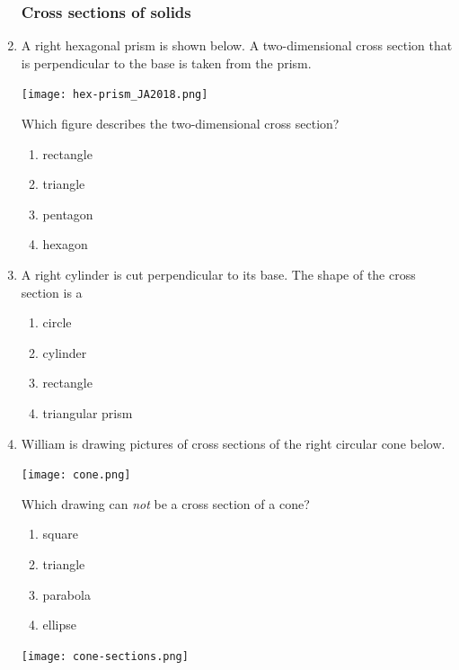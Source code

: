\documentclass[12pt, twoside]{article}
\begin{document}
\begin{enumerate}
  \newpage	
  \subsubsection*{Cross sections of solids} %
    
  \item %
  A right hexagonal prism is shown below. A two-dimensional cross section that is perpendicular to the base is taken from the prism.
    \begin{center}
    \texttt{[image: hex-prism\_JA2018.png]}
    \end{center}
   Which figure describes the two-dimensional cross section?
    \begin{multicols}{2}
      \begin{enumerate}
        \item rectangle
        \item triangle
        \item pentagon
        \item hexagon
      \end{enumerate}
    \end{multicols}

  \item  %
  A right cylinder is cut perpendicular to its base. The shape of the cross section is a
    \begin{multicols}{2}
      \begin{enumerate}
        \item circle
        \item cylinder
        \item rectangle
        \item triangular prism
      \end{enumerate}
    \end{multicols}
  
  \item William is drawing pictures of cross sections of the right circular cone below.
    \begin{center}
      \texttt{[image: cone.png]}
    \end{center}
      Which drawing can \emph{not} be a cross section of a cone?
      \begin{multicols}{2}
      \begin{enumerate}
      \item square
      \item triangle
      \item parabola
      \item ellipse
      \end{enumerate}
      \texttt{[image: cone-sections.png]}
    \end{multicols}


\end{enumerate}
\end{document}
